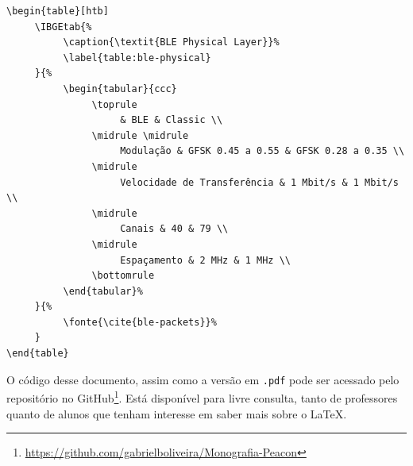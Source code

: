 \documentclass[
		12pt,				%
		openright,			%
		oneside,			%
		a4paper,			%
		chapter=TITLE,		%
		english,			%
		brazil				%
	]{abntex2}
\begin{document}
\begin{apendicesenv}
\begin{verbatim}
\begin{table}[htb]
     \IBGEtab{%
          \caption{\textit{BLE Physical Layer}}%
          \label{table:ble-physical}
     }{%
          \begin{tabular}{ccc}
               \toprule
                    & BLE & Classic \\
               \midrule \midrule
                    Modulação & GFSK 0.45 a 0.55 & GFSK 0.28 a 0.35 \\
               \midrule
                    Velocidade de Transferência & 1 Mbit/s & 1 Mbit/s \\
               \midrule 
                    Canais & 40 & 79 \\
               \midrule 
                    Espaçamento & 2 MHz & 1 MHz \\
               \bottomrule
          \end{tabular}%
     }{%
          \fonte{\cite{ble-packets}}%
     }
\end{table}
\end{verbatim}

O código desse documento, assim como a versão em \texttt{.pdf} pode ser acessado pelo repositório no GitHub\footnote{\url{https://github.com/gabrielboliveira/Monografia-Peacon}}. Está disponível para livre consulta, tanto de professores quanto de alunos que tenham interesse em saber mais sobre o \LaTeX.

\end{apendicesenv}

\end{document}
